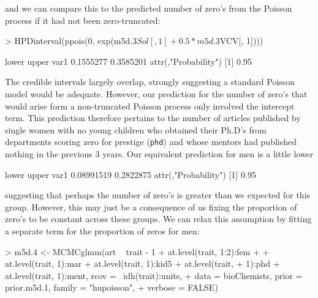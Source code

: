 \documentclass{article}
\begin{document}
and we can compare this to the predicted number of zero's from the Poisson process if it had not been zero-truncated:

\begin{Schunk}
\begin{Sinput}
> HPDinterval(ppois(0, exp(m5d.3$Sol[, 1] + 0.5 * m5d.3$VCV[, 1])))
\end{Sinput}
\begin{Soutput}
         lower     upper
var1 0.1555277 0.3585201
attr(,"Probability")
[1] 0.95
\end{Soutput}
\end{Schunk}

The credible intervals largely overlap, strongly suggesting a standard Poisson model would be adequate. However, our prediction for the number of zero's that would arise form a non-truncated Poisson process only involved the intercept term. This prediction therefore pertains to the number of articles published by single women with no young children who obtained their Ph.D's from departments scoring zero for prestige (\texttt{phd}) and whose mentors had published nothing in the previous 3 years.  Our equivalent prediction for men is a little lower 

\begin{Schunk}
\begin{Soutput}
          lower     upper
var1 0.08991519 0.2822875
attr(,"Probability")
[1] 0.95
\end{Soutput}
\end{Schunk}

suggesting that perhaps the number of zero's is greater than we expected for this group. However, this may just be a consequence of us fixing the proportion of zero's to be constant across these groups. We can relax this assumption by fitting a separate term for the proportion of zeros for men:

\begin{Schunk}
\begin{Sinput}
> m5d.4 <- MCMCglmm(art ~ trait - 1 + at.level(trait, 1:2):fem + 
+     at.level(trait, 1):mar + at.level(trait, 1):kid5 + at.level(trait, 
+     1):phd + at.level(trait, 1):ment, rcov = ~idh(trait):units, 
+     data = bioChemists, prior = prior.m5d.1, family = "hupoisson", 
+     verbose = FALSE)
\end{Sinput}
\end{Schunk}
\end{document}
